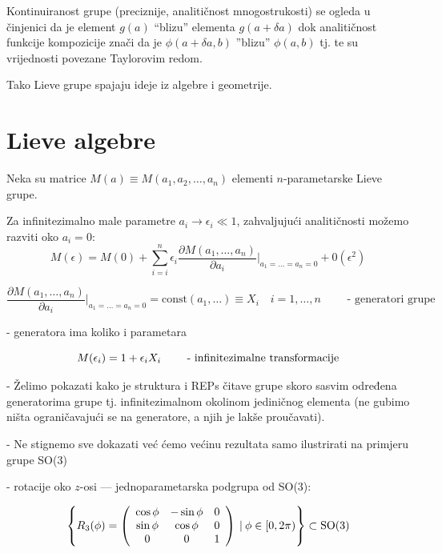 Kontinuiranost grupe (preciznije, analitičnost mnogostrukosti) se ogleda
u činjenici da je element $g(a)$ ``blizu'' elementa $g(a+\delta a)$ dok
analitičnost funkcije kompozicije znači da je $\phi(a+\delta a, b)$
''blizu'' $\phi(a,b)$ tj. te su vrijednosti povezane Taylorovim redom.

Tako Lieve grupe spajaju ideje iz algebre i geometrije.

\section{Lieve algebre}
\label{sec:lievealgebre}

Neka su matrice $M(a)\equiv M(a_1, a_2, \ldots, a_n)$ elementi $n$-parametarske
Lieve grupe.
 
Za infinitezimalno male parametre $a_i \to \epsilon_i \ll 1$, zahvaljujući
analitičnosti možemo razviti oko $a_i = 0$:
\begin{displaymath}
   M(\epsilon)=M(0)+ \sum_{i=i}^{n}\epsilon_i \frac{\partial M(a_1, \ldots, a_n)}
 {\partial a_i}\Bigg|_{a_1=\ldots =a_n=0} + 0(\epsilon^2)
\end{displaymath}


\begin{displaymath}
 \frac{\partial M(a_1, \ldots, a_n)}
 {\partial a_i}\Bigg|_{a_1=\ldots =a_n=0} = \textrm{const}(a_1, \ldots)
 \equiv  X_i  \quad i=1, \ldots, n \qquad \textrm{ - generatori grupe}
\end{displaymath}

- generatora ima koliko i parametara

\begin{displaymath}
  M(\epsilon_i)=1 + \epsilon_i X_i \qquad \textrm{ -
  infinitezimalne transformacije}
\end{displaymath}

- Želimo pokazati kako je struktura i REPs čitave grupe skoro sasvim
određena generatorima grupe tj. infinitezimalnom okolinom jediničnog 
elementa (ne gubimo ništa ograničavajući se na generatore, a njih
je lakše proučavati).

- Ne stignemo sve dokazati već ćemo većinu rezultata samo ilustrirati
  na primjeru grupe SO(3)


- rotacije oko $z$-osi --- jednoparametarska podgrupa od SO(3):

\begin{displaymath}
\left\{ R_3 (\phi) = \left( 
\begin{array}{ccc}
\cos\phi & -\sin\phi & 0 \\
\sin\phi & \cos\phi & 0 \\
0 & 0 & 1 
\end{array}
\right) \: | \: \phi \in [0, 2\pi) \right\} \subset \textrm{SO(3)}
\end{displaymath}

